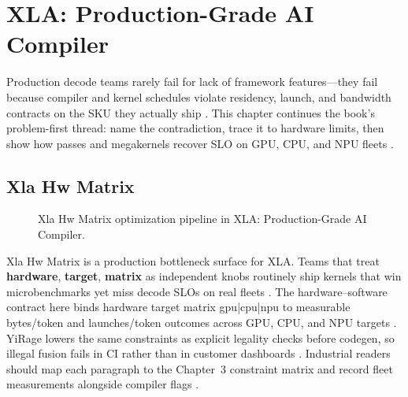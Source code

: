 \chapter{XLA: Production-Grade AI Compiler}
\label{chap:ch15}

Production decode teams rarely fail for lack of framework features---they fail because compiler and kernel schedules violate residency, launch, and bandwidth contracts on the SKU they actually ship \citep{patel2025llminference,nvidia2022hopper}. This chapter continues the book's problem-first thread: name the contradiction, trace it to hardware limits, then show how passes and megakernels recover SLO on GPU, CPU, and NPU fleets \citep{taxbreak2026,semianalysis2024tma}.

\section{Xla Hw Matrix}
\label{sec:xla_hw_matrix}
\begin{figure}[t]
\centering
{}
\caption{Xla Hw Matrix optimization pipeline in XLA: Production-Grade AI Compiler.}
\label{fig:xla_hw_matrix_pipeline}
\end{figure}


Xla Hw Matrix is a production bottleneck surface for XLA. Teams that treat \textbf{hardware}, \textbf{target}, \textbf{matrix} as independent knobs routinely ship kernels that win microbenchmarks yet miss decode SLOs on real fleets \citep{patel2025llminference,nvidia2022hopper}. The hardware--software contract here binds hardware target matrix gpu|cpu|npu to measurable bytes/token and launches/token outcomes across GPU, CPU, and NPU targets \citep{taxbreak2026,semianalysis2024tma}. YiRage lowers the same constraints as explicit legality checks before codegen, so illegal fusion fails in CI rather than in customer dashboards \citep{memoryfloor2026,amd2024xdna}. Industrial readers should map each paragraph to the Chapter~3 constraint matrix and record fleet measurements alongside compiler flags \citep{nvidia2022hopper,amd2024aie}.

